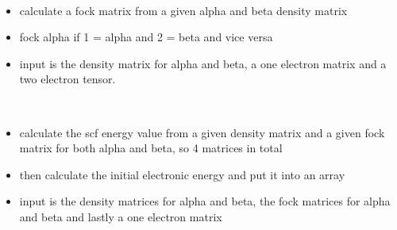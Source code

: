 \documentclass[letterpaper,10pt,english]{sphinxmanual}
\begin{document}

\begin{fulllineitems}
\label{\detokenize{SCF_functions:ghf.SCF_functions.uhf_fock_matrix}}~\begin{itemize}
\item {} 
calculate a fock matrix from a given alpha and beta density matrix

\item {} 
fock alpha if 1 = alpha and 2 = beta and vice versa

\item {} 
input is the density matrix for alpha and beta, a one electron matrix and a two electron tensor.

\end{itemize}

\end{fulllineitems}


\begin{fulllineitems}
\label{\detokenize{SCF_functions:ghf.SCF_functions.uhf_scf_energy}}~\begin{itemize}
\item {} 
calculate the scf energy value from a given density matrix and a given fock matrix for both alpha and beta, so 4 matrices in total

\item {} 
then calculate the initial electronic energy and put it into an array

\item {} 
input is the density matrices for alpha and beta, the fock matrices for alpha and beta and lastly a one electron matrix

\end{itemize}

\end{fulllineitems}
\end{document}
